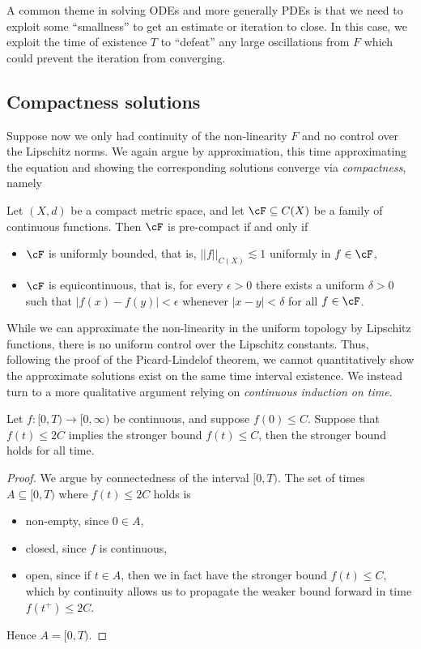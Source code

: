 \begin{remark}
	A common theme in solving ODEs and more generally PDEs is that we need to exploit some ``smallness'' to get an estimate or iteration to close. In this case, we exploit the time of existence $T$ to ``defeat'' any large oscillations from $F$ which could prevent the iteration from converging. 
\end{remark}


\subsection{Compactness solutions}

Suppose now we only had continuity of the non-linearity $F$ and no control over the Lipschitz norms. We again argue by approximation, this time approximating the equation and showing the corresponding solutions converge via \textit{compactness}, namely 

\begin{lemma}
	Let $(X, d)$ be a compact metric space, and let $\cF \subseteq C(X)$ be a family of continuous functions. Then $\cF$ is pre-compact if and only if 
	\begin{itemize}
		\item $\cF$ is uniformly bounded, that is, $||f||_{C(X)} \lesssim 1$ uniformly in $f \in \cF$, 
		\item $\cF$ is equicontinuous, that is, for every $\epsilon > 0$ there exists a uniform $\delta > 0$ such that $|f(x) - f(y)| < \epsilon$ whenever $|x - y| < \delta$ for all $f \in \cF$.
	\end{itemize}
\end{lemma}

While we can approximate the non-linearity in the uniform topology by Lipschitz functions, there is no uniform control over the Lipschitz constants. Thus, following the proof of the Picard-Lindelof theorem, we cannot quantitatively show the approximate solutions exist on the same time interval existence. We instead turn to a more qualitative argument relying on \textit{continuous induction on time}. 

\begin{lemma}
	Let $f : [0, T) \to [0, \infty)$ be continuous, and suppose $f(0) \leq C$. Suppose that $f(t) \leq 2C$ implies the stronger bound $f(t) \leq C$, then the stronger bound holds for all time. 
\end{lemma}

\begin{proof}
	We argue by connectedness of the interval $[0, T)$. The set of times $A \subseteq [0, T)$ where $f(t) \leq 2C$ holds is
		\begin{itemize}
			\item non-empty, since $0 \in A$, 
			\item closed, since $f$ is continuous, 
			\item open, since if $t \in A$, then we in fact have the stronger bound $f(t) \leq C$, which by continuity allows us to propagate the weaker bound forward in time $f(t^+) \leq 2C$. 
		\end{itemize}
	Hence $A = [0, T)$. 
\end{proof}


